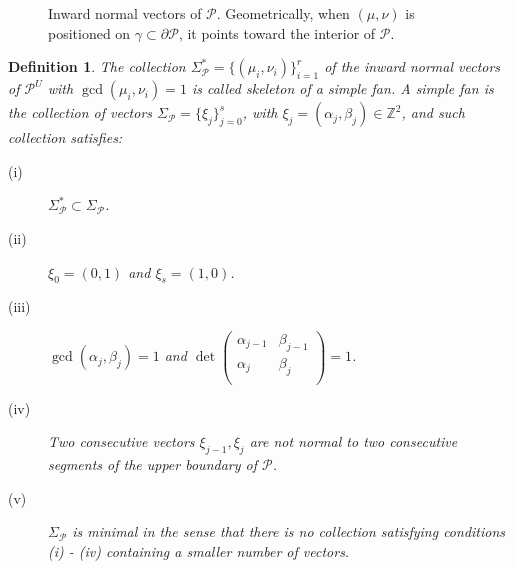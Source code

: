 \documentclass[12pt]{amsart}
\newtheorem{definition}[theorem]{Definition}
\begin{document}
\begin{figure}[h]
\caption{\footnotesize{Inward normal vectors of $\mathcal{P}$. Geometrically, when $(\mu,\nu)$ is positioned on $\gamma\subset\partial\mathcal{P}$, it points toward the interior of $\mathcal{P}$.}}
\label{fig-inward-normal-vectors}
\end{figure}

\begin{definition} The collection $\Sigma^{*}_{\mathcal{P}} = \{(\mu_{i},\nu_{i})\}_{i=1}^{r}$ of the inward normal vectors of $\mathcal{P}^{U}$ with $\gcd(\mu_{i},\nu_{i}) = 1$ is called \emph{skeleton of a simple fan}. A \emph{simple fan} is the collection of vectors $\Sigma_{\mathcal{P}} = \{\xi_{j}\}_{j = 0}^{s}$, with $\xi_{j} = (\alpha_{j},\beta_{j})\in\mathbb{Z}^{2}$, and such collection satisfies:
\begin{description}
    \item[(i)] $\Sigma^{*}_{\mathcal{P}}\subset \Sigma_{\mathcal{P}}$.
    \item[(ii)] $\xi_{0} = (0,1)$ and $\xi_{s} = (1,0)$.
    \item[(iii)] $\gcd(\alpha_{j},\beta_{j}) = 1$ and $\det\left(
  \begin{array}{cc}
    \alpha_{j-1} & \beta_{j-1} \\
    \alpha_{j} & \beta_{j} \\
  \end{array}
\right) = 1$.
    \item[(iv)] Two consecutive vectors $\xi_{j-1},\xi_{j}$ are not normal to two consecutive segments of the upper boundary of $\mathcal{P}$. 
    \item[(v)] $\Sigma_{\mathcal{P}}$ is \emph{minimal} in the sense that there is no collection satisfying conditions (i) - (iv) containing a smaller number of vectors.
\end{description}
\end{definition}
\end{document}
